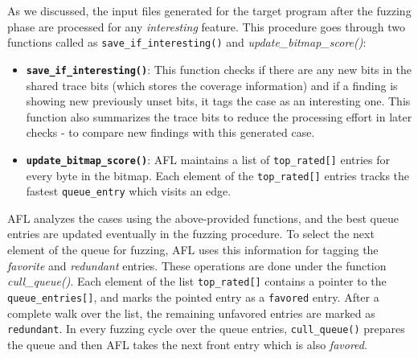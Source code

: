 As we discussed, the input files generated for the target program after the fuzzing phase are processed for any \textit{interesting} feature. This procedure goes through two functions called as \texttt{save\_if\_interesting()} and \textit{update\_bitmap\_score()}:

\begin{itemize}
    \item \textbf{\texttt{save\_if\_interesting()}}: This function checks if there are any new bits in the shared trace bits (which stores the coverage information) and if a finding is showing new previously unset bits, it tags the case as an interesting one. This function also summarizes the trace bits to reduce the processing effort in later checks - to compare new findings with this generated case.

    \item \textbf{\texttt{update\_bitmap\_score()}}: AFL maintains a list of \texttt{top\_rated[]} entries for every byte in the bitmap. Each element of the \texttt{top\_rated[]} entries tracks the fastest \texttt{queue\_entry} which visits an edge.
\end{itemize}

AFL analyzes the cases using the above-provided functions, and the best queue entries are updated eventually in the fuzzing procedure. To select the next element of the queue for fuzzing, AFL uses this information for tagging the \textit{favorite} and \textit{redundant} entries. These operations are done under the function \textit{cull\_queue()}. Each element of the list \texttt{top\_rated[]} contains a pointer to the \texttt{queue\_entries[]}, and marks the pointed entry as a \texttt{favored} entry. After a complete walk over the list, the remaining unfavored entries are marked as \texttt{redundant}. In every fuzzing cycle over the queue entries, \texttt{cull\_queue()} prepares the queue and then AFL takes the next front entry which is also \textit{favored}.



